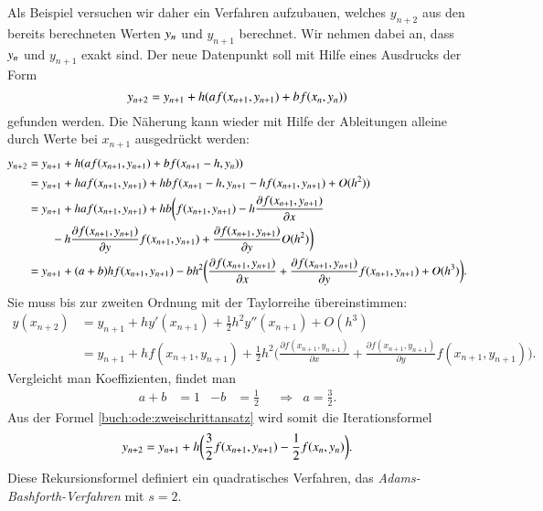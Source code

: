Als Beispiel versuchen wir daher ein Verfahren aufzubauen, welches
$y_{n+2}$ aus den bereits berechneten Werten $y_{n\mathstrut}$ und
$y_{n+1}$ berechnet.
Wir nehmen dabei an, dass $y_{n\mathstrut}$ und $y_{n+1}$ exakt
sind.
Der neue Datenpunkt soll mit Hilfe eines Ausdrucks der Form
\begin{equation}
y_{n+2}=y_{n+1} + h(af(x_{n+1},y_{n+1}) + b f(x_{n\mathstrut},y_{n\mathstrut}))
\label{buch:ode:zweischrittansatz}
\end{equation}
gefunden werden.
Die Näherung kann wieder mit Hilfe der Ableitungen alleine
durch Werte bei $x_{n+1}$ ausgedrückt werden:
\begin{align*}
y_{n+2}
&=
y_{n+1}+h(af(x_{n+1}, y_{n+1}) + bf(x_{n+1}-h, y_{n\mathstrut}))
\\
&=
y_{n+1}+haf(x_{n+1}, y_{n+1}) + hbf(x_{n+1}-h, y_{n+1} - h f(x_{n+1},y_{n+1}) + O(h^2))
\\
&=
y_{n+1}+haf(x_{n+1}, y_{n+1}) + hb
\biggl(
f(x_{n+1},y_{n+1})
-h \frac{\partial f(x_{n+1},y_{n+1})}{\partial x}
\\
&\qquad
-h
\frac{\partial f(x_{n+1},y_{n+1})}{\partial y}
f(x_{n+1},y_{n+1})
+ 
\frac{\partial f(x_{n+1},y_{n+1})}{\partial y}
O(h^2)
\biggr)
\\
&=
y_{n+1}
+ (a+b)hf(x_{n+1},y_{n+1})
- bh^2\biggl(
\frac{\partial f(x_{n+1},y_{n+1})}{\partial x}
+
\frac{\partial f(x_{n+1},y_{n+1})}{\partial y}
f(x_{n+1},y_{n+1})
+O(h^3)
\biggr).
\end{align*}
Sie muss bis zur zweiten Ordnung mit der Taylorreihe übereinstimmen:
\begin{align*}
y(x_{n+2})
&=
y_{n+1} + hy'(x_{n+1}) + \frac12h^2 y''(x_{n+1})+O(h^3)
\\
&=
y_{n+1}+hf(x_{n+1},y_{n+1})+\frac12h^2\biggl(
\frac{\partial f(x_{n+1},y_{n+1})}{\partial x}
+
\frac{\partial f(x_{n+1},y_{n+1})}{\partial y}
f(x_{n+1},y_{n+1})
\biggr).
\end{align*}
Vergleicht man Koeffizienten, findet man
\[
\begin{aligned}
a+b&=1&-b&=\frac12&&\Rightarrow&a=\frac32.
\end{aligned}
\]
Aus der Formel \eqref{buch:ode:zweischrittansatz} wird somit die
Iterationsformel
\begin{equation}
y_{n+2}=y_{n+1}+h\biggl(\frac32f(x_{n+1},y_{n+1})
- \frac12 f(x_{n\mathstrut},y_{n\mathstrut})\biggr).
\end{equation}
Diese Rekursionsformel definiert ein quadratisches Verfahren, das
{\em Adams-Bashforth-Verfahren} mit $s=2$.

